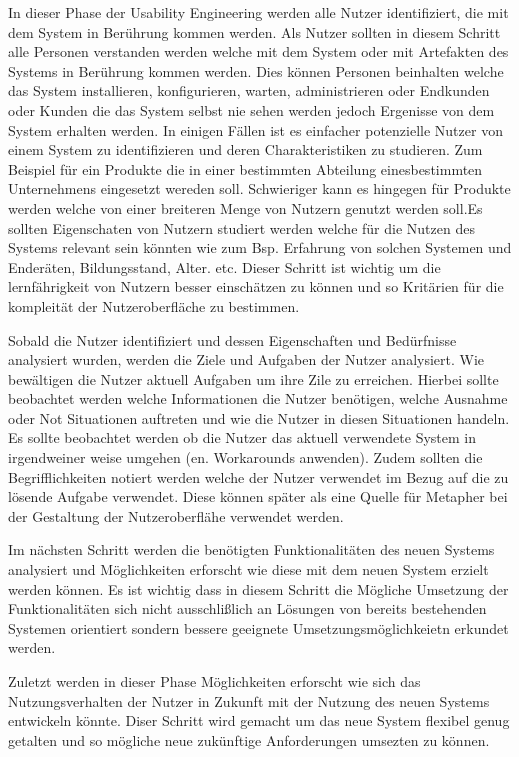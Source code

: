In dieser Phase der Usability Engineering werden alle Nutzer identifiziert, die mit dem System in Berührung kommen werden. Als Nutzer sollten in diesem Schritt alle Personen 
verstanden werden welche mit dem System oder mit Artefakten des Systems in Berührung kommen werden. Dies können Personen beinhalten welche das System installieren, konfigurieren, 
warten, administrieren oder Endkunden oder Kunden die das System selbst nie sehen werden jedoch Ergenisse von dem System erhalten werden.  In einigen Fällen ist es einfacher potenzielle 
Nutzer von einem System zu identifizieren und deren Charakteristiken zu studieren. Zum Beispiel für ein Produkte die in einer bestimmten Abteilung einesbestimmten Unternehmens eingesetzt 
wereden soll. Schwieriger kann es hingegen für Produkte werden welche von einer breiteren Menge von Nutzern genutzt werden soll.Es sollten Eigenschaten von Nutzern studiert werden 
welche für die Nutzen des Systems relevant sein könnten wie zum Bsp. Erfahrung von solchen Systemen und Enderäten, Bildungsstand, Alter. etc. Dieser Schritt ist wichtig um die lernfährigkeit 
von Nutzern besser einschätzen zu können und so Kritärien für die kompleität der Nutzeroberfläche zu bestimmen.

Sobald die Nutzer identifiziert und dessen Eigenschaften und Bedürfnisse analysiert wurden, werden die Ziele und Aufgaben der Nutzer analysiert. Wie bewältigen die  Nutzer  aktuell Aufgaben um 
ihre Zile zu erreichen. Hierbei sollte beobachtet werden welche Informationen die Nutzer benötigen, welche Ausnahme oder Not Situationen  auftreten und wie die Nutzer in diesen Situationen handeln. 
Es sollte beobachtet werden ob die Nutzer das aktuell verwendete System in irgendweiner  weise umgehen (en. Workarounds anwenden). Zudem sollten die Begrifflichkeiten notiert werden welche der 
Nutzer verwendet im Bezug auf die zu lösende Aufgabe verwendet.  Diese können später als eine Quelle für Metapher bei der Gestaltung der Nutzeroberflähe verwendet werden. 

Im nächsten Schritt werden die benötigten Funktionalitäten des neuen Systems analysiert und Möglichkeiten erforscht wie diese mit dem neuen System erzielt werden können. 
Es ist wichtig dass in diesem Schritt die Mögliche Umsetzung der Funktionalitäten sich nicht ausschlißlich an Lösungen von bereits bestehenden Systemen orientiert sondern 
bessere geeignete Umsetzungsmöglichkeietn erkundet werden.

Zuletzt werden in dieser Phase Möglichkeiten erforscht wie sich das Nutzungsverhalten der Nutzer in Zukunft mit der Nutzung des neuen Systems entwickeln könnte. Diser Schritt wird  
gemacht um das neue System flexibel genug getalten und so mögliche neue zukünftige Anforderungen umsezten zu können.

